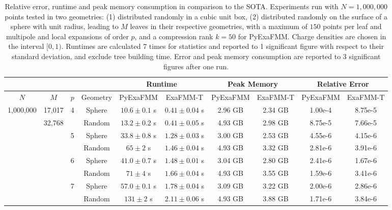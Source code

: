 \documentclass{IEEEcsmag}
\begin{document}
\begin{table}[t]
	\centering
	\caption{Relative error, runtime and peak memory consumption in comparison to the SOTA. Experiments run with $N=1,000,000$ points tested in two geometries: (1) distributed randomly in a cubic unit box, (2) distributed randomly on the surface of a sphere with unit radius, leading to $M$ leaves in their respective geometries, with a maximum of $150$ points per leaf and multipole and local expansions of order $p$, and a compression rank $k=50$ for PyExaFMM. Charge densities are chosen in the interval $[0, 1)$. Runtimes are calculated 7 times for statistics and reported to 1 significant figure with respect to their standard deviation, and exclude tree building time. Error and peak memory consumption are reported to 3 significant figures after one run.}
	\begin{tabular}{|*{10}{c|}}
		\hline
		& & &   & \multicolumn{2}{c|}{Runtime} & \multicolumn{2}{c|}{Peak Memory} & \multicolumn{2}{c|}{Relative Error}\\
		\hline
		$N$ & $M$ &$p$ &  Geometry   &   PyExaFMM  &  ExaFMM-T &    PyExaFMM  &  ExaFMM-T  &   PyExaFMM  &  ExaFMM-T\\
		\hline
		1,000,000 & 17,017 & 4   &   Sphere  &  $10.6 \pm 0.1$ s & $0.41 \pm 0.04$ s  &  2.96 GB  &   2.34 GB  & 1.00e-4 & 8.75e-5\\
		 & 32,768 &    &   Random  &  $13.2 \pm 0.2$ s &  $0.41 \pm 0.05$ s &  4.93 GB  &   2.98 GB  & 8.75e-5 & 7.66e-5\\
		&  & 5   &   Sphere  &    $33.8 \pm 0.8$ s & $1.28 \pm 0.03$ s &  3.00 GB  &  2.53 GB  & 4.55e-6 & 4.15e-6\\
		 &  &   &   Random  &  $65 \pm 2$ s &    $1.46 \pm 0.04$ s  &  4.93 GB  &   3.32 GB  & 2.81e-6 & 3.91e-6\\
		 &  & 6   &   Sphere  &  $41.0 \pm 0.7$ s &   $1.48 \pm 0.01$ s  &  3.04 GB  &   2.80 GB  & 2.41e-6 & 1.67e-6\\
		 &  &    &   Random  &  $71 \pm 4$ s &   $1.66 \pm 0.04$ s  &  4.93 GB  &   3.55 GB  & 1.59e-6 & 3.41e-6\\
		 &  & 7   &   Sphere  &  $57.0 \pm 0.1$ s &  $1.78 \pm 0.04$ s  &  3.09 GB  &   3.22 GB  & 2.00e-6 & 2.86e-6\\
		 &  &    &   Random  & $131 \pm 2$ s &   $2.11 \pm 0.06$ s  &  4.93 GB  &   3.88 GB  & 1.71e-6 & 3.84e-6\\
		\hline
	\end{tabular}
	\label{tab:performance}
 \end{table}
\end{document}
